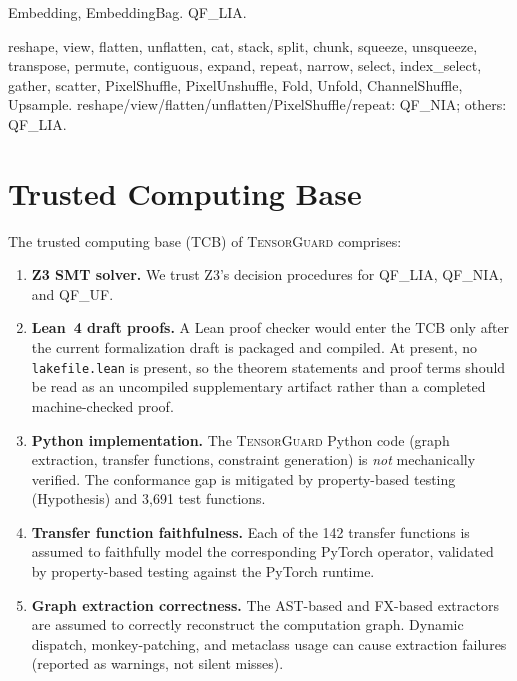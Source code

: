 \documentclass[10pt]{article}
\newcommand{\tguard}{\textsc{TensorGuard}}
\theoremstyle{plain}
\theoremstyle{definition}
\theoremstyle{remark}
\begin{document}
\begin{description}[leftmargin=1.5em]
  \item[Embedding (2):] Embedding, EmbeddingBag.
    QF\_LIA.

  \item[Structural (26):] reshape, view, flatten, unflatten,
    cat, stack, split, chunk, squeeze, unsqueeze, transpose,
    permute, contiguous, expand, repeat, narrow, select,
    index\_select, gather, scatter, PixelShuffle, PixelUnshuffle,
    Fold, Unfold, ChannelShuffle, Upsample.
    reshape/view/flatten/unflatten/PixelShuffle/repeat: QF\_NIA;
    others: QF\_LIA.
\end{description}


\section{Trusted Computing Base}\label{app:tcb}

The trusted computing base (TCB) of \tguard{} comprises:

\begin{enumerate}[leftmargin=2em]
  \item \textbf{Z3 SMT solver.}  We trust Z3's decision procedures
    for QF\_LIA, QF\_NIA, and QF\_UF.

  \item \textbf{Lean~4 draft proofs.}  A Lean proof checker would enter
    the TCB only after the current formalization draft is packaged and
    compiled. At present, no \texttt{lakefile.lean} is present, so the
    theorem statements and proof terms should be read as an uncompiled
    supplementary artifact rather than a completed machine-checked proof.

  \item \textbf{Python implementation.}  The \tguard{} Python code
    (graph extraction, transfer functions, constraint generation) is
    \emph{not} mechanically verified.  The conformance gap is
    mitigated by property-based testing (Hypothesis) and 3{,}691
    test functions.

  \item \textbf{Transfer function faithfulness.}  Each of the 142
    transfer functions is assumed to faithfully model the
    corresponding PyTorch operator, validated by property-based
    testing against the PyTorch runtime.

  \item \textbf{Graph extraction correctness.}  The AST-based and
    FX-based extractors are assumed to correctly reconstruct the
    computation graph.  Dynamic dispatch, monkey-patching, and
    metaclass usage can cause extraction failures (reported as
    warnings, not silent misses).
\end{enumerate}
\end{document}
